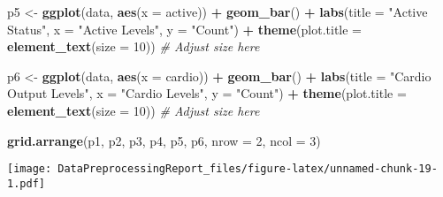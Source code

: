 \documentclass[
]{article}
\newenvironment{Shaded}{\begin{snugshade}}{\end{snugshade}}
\newcommand{\AttributeTok}[1]{\textcolor[rgb]{0.13,0.29,0.53}{#1}}
\newcommand{\CommentTok}[1]{\textcolor[rgb]{0.56,0.35,0.01}{\textit{#1}}}
\newcommand{\DecValTok}[1]{\textcolor[rgb]{0.00,0.00,0.81}{#1}}
\newcommand{\FunctionTok}[1]{\textcolor[rgb]{0.13,0.29,0.53}{\textbf{#1}}}
\newcommand{\NormalTok}[1]{#1}
\newcommand{\OtherTok}[1]{\textcolor[rgb]{0.56,0.35,0.01}{#1}}
\newcommand{\SpecialCharTok}[1]{\textcolor[rgb]{0.81,0.36,0.00}{\textbf{#1}}}
\newcommand{\StringTok}[1]{\textcolor[rgb]{0.31,0.60,0.02}{#1}}
\begin{document}
\begin{Shaded}
\begin{Highlighting}[]
\NormalTok{p5 }\OtherTok{\textless{}{-}} \FunctionTok{ggplot}\NormalTok{(data, }\FunctionTok{aes}\NormalTok{(}\AttributeTok{x =}\NormalTok{ active)) }\SpecialCharTok{+}
  \FunctionTok{geom\_bar}\NormalTok{() }\SpecialCharTok{+}
  \FunctionTok{labs}\NormalTok{(}\AttributeTok{title =} \StringTok{"Active Status"}\NormalTok{,}
       \AttributeTok{x =} \StringTok{"Active Levels"}\NormalTok{,}
       \AttributeTok{y =} \StringTok{"Count"}\NormalTok{) }\SpecialCharTok{+}
  \FunctionTok{theme}\NormalTok{(}\AttributeTok{plot.title =} \FunctionTok{element\_text}\NormalTok{(}\AttributeTok{size =} \DecValTok{10}\NormalTok{)) }\CommentTok{\# Adjust size here}

\NormalTok{p6 }\OtherTok{\textless{}{-}} \FunctionTok{ggplot}\NormalTok{(data, }\FunctionTok{aes}\NormalTok{(}\AttributeTok{x =}\NormalTok{ cardio)) }\SpecialCharTok{+}
  \FunctionTok{geom\_bar}\NormalTok{() }\SpecialCharTok{+}
  \FunctionTok{labs}\NormalTok{(}\AttributeTok{title =} \StringTok{"Cardio Output Levels"}\NormalTok{,}
       \AttributeTok{x =} \StringTok{"Cardio Levels"}\NormalTok{,}
       \AttributeTok{y =} \StringTok{"Count"}\NormalTok{) }\SpecialCharTok{+}
  \FunctionTok{theme}\NormalTok{(}\AttributeTok{plot.title =} \FunctionTok{element\_text}\NormalTok{(}\AttributeTok{size =} \DecValTok{10}\NormalTok{)) }\CommentTok{\# Adjust size here}

\FunctionTok{grid.arrange}\NormalTok{(p1, p2, p3, p4, p5, p6, }\AttributeTok{nrow =} \DecValTok{2}\NormalTok{, }\AttributeTok{ncol =} \DecValTok{3}\NormalTok{)}
\end{Highlighting}
\end{Shaded}

\texttt{[image: DataPreprocessingReport\_files/figure-latex/unnamed-chunk-19-1.pdf]}
\end{document}
